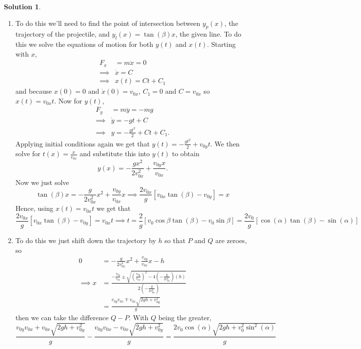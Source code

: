 \documentclass[10pt]{article}
\theoremstyle{definition}
\newtheorem{soln}{Solution}
\begin{document}
\begin{soln}~
  \begin{enumerate}[label=(\alph*)]
    \item To do this we'll need to find the point of intersection between $y_p(x)$, the trajectory of the projectile, and $y_l(x)=\tan(\beta)x$, the given line.
          To do this we solve the equations of motion for both $y(t)$ and $x(t)$. Starting with $x$,
          \begin{align*}
            F_x      & =m\ddot{x}=0 \\
            \implies & \dot{x}=C    \\
            \implies & x(t)=Ct+C_1
          \end{align*}
          and because $x(0)=0$ and $\dot{x}(0)=v_{0x}$, $C_1=0$ and $C=v_{0x}$ so $x(t)=v_{0x}t$. Now for $y(t)$,
          \begin{align*}
            F_y      & =m\ddot{y}=-mg            \\
            \implies & \dot{y}=-gt+C             \\
            \implies & y=-\frac{gt^2}{2}+Ct+C_1.
          \end{align*}
          Applying initial conditions again we get that $y(t)=-\frac{gt^2}{2}+v_{0y}t$. We then solve for $t(x)=\frac{x}{v_{0x}}$ and substitute this into $y(t)$ to obtain
          $$y(x)=-\frac{gx^2}{2v_{0x}^2}+\frac{v_{0y}x}{v_{0x}}.$$
          Now we just solve
          $$\tan(\beta)x=-\frac{g}{2v_{0x}^2}x^2+\frac{v_{0y}}{v_{0x}}x\implies \frac{2v_{0x}}{g}\left[v_{0x}\tan(\beta)-v_{0y}\right]=x$$
          Hence, using $x(t)=v_{0x}t$ we get that 
          $$\frac{2v_{0x}}{g}\left[v_{0x}\tan(\beta)-v_{0y}\right]=v_{0x}t\implies t=
          \frac{2}{g}\left[v_0\cos\beta\tan(\beta)-v_0\sin\beta\right]=\frac{2v_0}{g}\left[\cos(\alpha)\tan(\beta)-\sin(\alpha)\right]$$
    \item To do this we just shift down the trajectory by $h$ so that $P$ and $Q$ are zeroes, so
          \begin{align*}
            0           & =-\frac{g}{2v_{0x}^2}x^2+\frac{v_{0y}}{v_{0x}}x-h                                                                                                                 \\
            \implies  x & =\frac{-\frac{v_{0y}}{v_{0x}}\pm\sqrt{\left(\frac{v_{0y}}{v_{0x}}\right)^2-4\left(-\frac{g}{2v_{0x}^2}\right)\left(h\right)}}{2\left(-\frac{g}{2v_{0x}^2}\right)} \\
                        & =\frac{v_{0y}v_{0x}\mp v_{0x}\sqrt{2gh+v_{0y}^2}}{g}
          \end{align*}
          then we can take the difference $Q-P$. With $Q$ being the greater,
          $$\frac{v_{0y}v_{0x}+ v_{0x}\sqrt{2gh+v_{0y}^2}}{g}-\frac{v_{0y}v_{0x}- v_{0x}\sqrt{2gh+v_{0y}^2}}{g}=\frac{2v_0\cos(\alpha)\sqrt{2gh+v_0^2\sin^2(\alpha)}}{g}$$

  \end{enumerate}
\end{soln}
\end{document}

